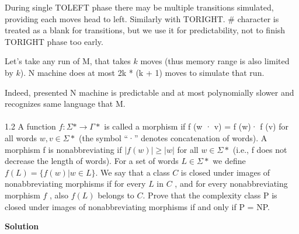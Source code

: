 \documentclass[12pt]{article}
\begin{document}
During single TOLEFT phase there may be multiple transitions simulated, providing each moves head to left. Similarly with TORIGHT.
\# character is treated as a blank for transitions, but we use it for predictability, not to finish TORIGHT phase too early.

Let's take any run of M, that takes $k$ moves (thus memory range is also limited by $k$). N machine does at most 2k * (k + 1) moves to simulate that run.


Indeed, presented N machine is predictable and at most polynomially slower and recognizes same language that M. \\\\


1.2    A function $f\colon\Sigma\ast\to\Gamma\ast$ is called a morphism if f (w · v) = f (w)· f (v)
for all words $w, v \in \Sigma\ast$
(the symbol “·” denotes concatenation of words). A morphism f is
nonabbreviating if $|f(w)| \ge |w|$ for all $w \in \Sigma\ast$
(i.e., f does not decrease the length of words).
For a set of words $L \in \Sigma\ast$ we define $f(L) = \{f(w) | w \in L\}$. We say that a class $C$ is closed under
images of nonabbreviating morphisms if for every  $L$ in  $C$ , and for every nonabbreviating
morphism  $f$ , also  $f(L)$ belongs to  $C$.
Prove that the complexity class P is closed under images of nonabbreviating morphisms if and only if P = NP.

{\bf Solution}
\end{document}
